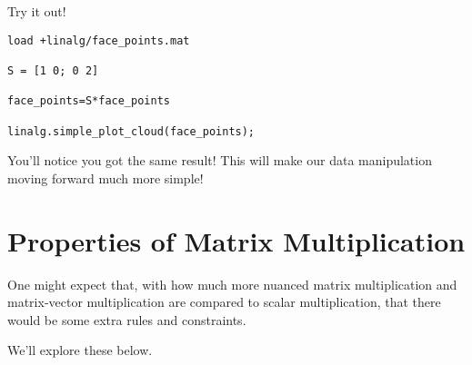 \documentclass{ximera}
\begin{document}
Try it out!

\begin{verbatim}
load +linalg/face_points.mat

S = [1 0; 0 2]

face_points=S*face_points

linalg.simple_plot_cloud(face_points);
\end{verbatim}

You'll notice you got the same result! This will make our data manipulation moving forward much more simple!

\section*{Properties of Matrix Multiplication}

    One might expect that, with how much more nuanced matrix multiplication and matrix-vector multiplication are compared to scalar multiplication, that there would be some extra rules and constraints.

    We'll explore these below.
\end{document}
